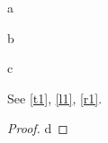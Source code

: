 \documentclass[envcountsame]{llncs}
\begin{document}
\begin{theorem}\label{t1}a\end{theorem}
\begin{lemma}\label{l1}b\end{lemma}
\begin{remark}\label{r1}c\end{remark}
See \autoref{t1}, \autoref{l1}, \autoref{r1}.
\begin{proof}d\end{proof}
\end{document}
